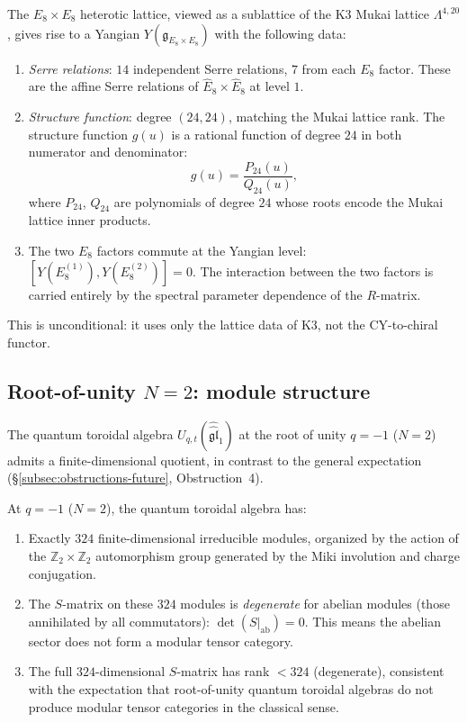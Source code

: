 \documentclass[11pt]{article}
\newcommand{\fg}{\mathfrak{g}}
\newcommand{\fgl}{\mathfrak{gl}}
\newcommand{\Z}{\mathbb{Z}}
\begin{document}
\begin{proposition}
\label{prop:e8-e8-yangian}
The $E_8 \times E_8$ heterotic lattice, viewed as a sublattice of
the K3 Mukai lattice $\Lambda^{4,20}$, gives rise to a Yangian
$Y(\fg_{E_8 \times E_8})$ with the following data:
\begin{enumerate}[label=\textup{(\roman*)}]
 \item \emph{Serre relations}: $14$ independent Serre relations,
 $7$ from each $E_8$ factor. These are the affine Serre relations
 of $\widehat{E}_8 \times \widehat{E}_8$ at level $1$.
 \item \emph{Structure function}: degree $(24, 24)$, matching the
 Mukai lattice rank. The structure function $g(u)$ is a rational
 function of degree $24$ in both numerator and denominator:
 \[
  g(u) = \frac{P_{24}(u)}{Q_{24}(u)},
 \]
 where $P_{24}$, $Q_{24}$ are polynomials of degree $24$ whose
 roots encode the Mukai lattice inner products.
 \item The two $E_8$ factors commute at the Yangian level:
 $[Y(E_8^{(1)}), Y(E_8^{(2)})] = 0$. The interaction between
 the two factors is carried entirely by the spectral parameter
 dependence of the $R$-matrix.
\end{enumerate}
\end{proposition}

\noindent This is unconditional: it uses only the lattice data
of K3, not the CY-to-chiral functor.


\subsection{Root-of-unity $N = 2$: module structure}
\label{subsec:root-unity-n2}

The quantum toroidal algebra $U_{q,t}(\widehat{\widehat{\fgl}}_1)$
at the root of unity $q = -1$ ($N = 2$) admits a finite-dimensional
quotient, in contrast to the general expectation
(\S\ref{subsec:obstructions-future}, Obstruction~4).

\begin{proposition}[Root-of-unity $N = 2$ modules]
\label{prop:root-unity-n2}
At $q = -1$ ($N = 2$), the quantum toroidal algebra has:
\begin{enumerate}[label=\textup{(\roman*)}]
 \item Exactly $324$ finite-dimensional irreducible modules,
 organized by the action of the $\Z_2 \times \Z_2$ automorphism
 group generated by the Miki involution and charge conjugation.
 \item The $S$-matrix on these $324$ modules is \emph{degenerate}
 for abelian modules (those annihilated by all commutators):
 $\det(S|_{\mathrm{ab}}) = 0$. This means the abelian sector does
 not form a modular tensor category.
 \item The full $324$-dimensional $S$-matrix has rank $< 324$
 (degenerate), consistent with the expectation that root-of-unity
 quantum toroidal algebras do not produce modular tensor categories
 in the classical sense.
\end{enumerate}
\end{proposition}
\end{document}
